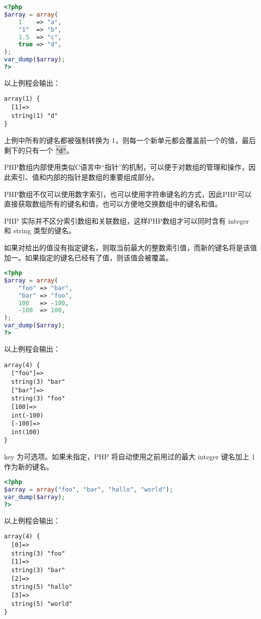 \begin{lstlisting}[language=PHP]
<?php
$array = array(
    1    => "a",
    "1"  => "b",
    1.5  => "c",
    true => "d",
);
var_dump($array);
?>
\end{lstlisting}

以上例程会输出：


\begin{verbatim}
array(1) {
  [1]=>
  string(1) "d"
}
\end{verbatim}

上例中所有的键名都被强制转换为 1，则每一个新单元都会覆盖前一个的值，最后剩下的只有一个 \colorbox{lightgray}{\texttt{"d"}}。

PHP数组内部使用类似C语言中“指针”的机制，可以便于对数组的管理和操作，因此索引、值和内部的指针是数组的重要组成部分。

PHP数组不仅可以使用数字索引，也可以使用字符串键名的方式，因此PHP可以直接获取数组所有的键名和值，也可以方便地交换数组中的键名和值。



PHP 实际并不区分索引数组和关联数组，这样PHP数组才可以同时含有 integer 和 string 类型的键名。



如果对给出的值没有指定键名，则取当前最大的整数索引值，而新的键名将是该值加一。如果指定的键名已经有了值，则该值会被覆盖。

\begin{lstlisting}[language=PHP]
<?php
$array = array(
    "foo" => "bar",
    "bar" => "foo",
    100   => -100,
    -100  => 100,
);
var_dump($array);
?>
\end{lstlisting}

以上例程会输出：


\begin{verbatim}
array(4) {
  ["foo"]=>
  string(3) "bar"
  ["bar"]=>
  string(3) "foo"
  [100]=>
  int(-100)
  [-100]=>
  int(100)
}
\end{verbatim}

key 为可选项。如果未指定，PHP 将自动使用之前用过的最大 integer 键名加上 1 作为新的键名。

\begin{lstlisting}[language=PHP]
<?php
$array = array("foo", "bar", "hallo", "world");
var_dump($array);
?>
\end{lstlisting}

以上例程会输出：


\begin{verbatim}
array(4) {
  [0]=>
  string(3) "foo"
  [1]=>
  string(3) "bar"
  [2]=>
  string(5) "hallo"
  [3]=>
  string(5) "world"
}
\end{verbatim}

